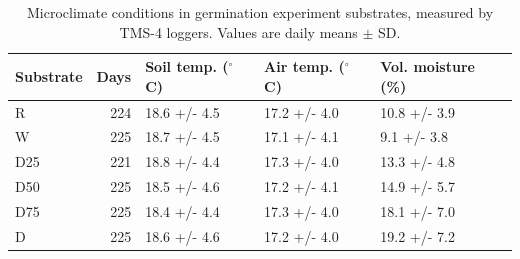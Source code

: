\begin{table}[htbp]
\centering
\caption{Microclimate conditions in germination experiment substrates, measured by TMS-4 loggers. Values are daily means $\pm$ SD.}
\label{tab:microclimate}
\small
\begin{tabular}{l r l l l}
\toprule
Substrate & Days & Soil temp. ($^{\circ}$C) & Air temp. ($^{\circ}$C) & Vol. moisture (\%) \\
\midrule
R      & 224 & 18.6 +/- 4.5 & 17.2 +/- 4.0 & 10.8 +/- 3.9 \\
W      & 225 & 18.7 +/- 4.5 & 17.1 +/- 4.1 & 9.1 +/- 3.8 \\
D25    & 221 & 18.8 +/- 4.4 & 17.3 +/- 4.0 & 13.3 +/- 4.8 \\
D50    & 225 & 18.5 +/- 4.6 & 17.2 +/- 4.1 & 14.9 +/- 5.7 \\
D75    & 225 & 18.4 +/- 4.4 & 17.3 +/- 4.0 & 18.1 +/- 7.0 \\
D      & 225 & 18.6 +/- 4.6 & 17.2 +/- 4.0 & 19.2 +/- 7.2 \\
\bottomrule
\end{tabular}
\end{table}
